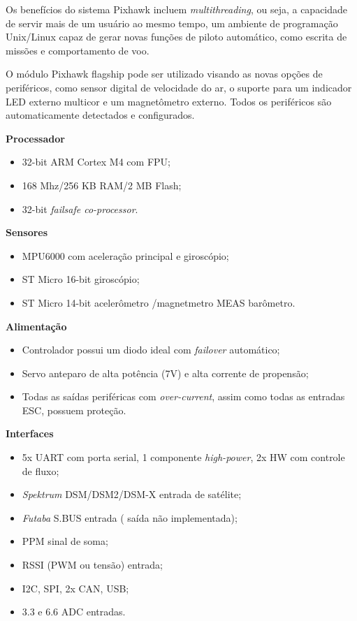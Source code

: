 Os benefícios do sistema Pixhawk incluem \textit{multithreading}, ou seja, a capacidade de servir mais de um usuário ao 
mesmo tempo, um ambiente de programação Unix/Linux capaz de gerar novas funções de piloto automático, como 
escrita de missões e comportamento de voo. \cite{pix}
 
O módulo Pixhawk flagship pode ser utilizado visando as novas opções de periféricos, como sensor digital de velocidade do ar, o suporte para um indicador LED externo multicor e um magnetômetro externo. Todos os periféricos são automaticamente detectados e configurados. \cite{pix}


\textbf{Processador}
\begin{itemize}
	\item 32-bit ARM Cortex M4 com FPU;
	\item 168 Mhz/256 KB RAM/2 MB Flash;
	\item 32-bit \textit{failsafe co-processor}.
\end{itemize}

\textbf{Sensores}
\begin{itemize}
\item MPU6000 com aceleração principal e giroscópio;
\item ST Micro 16-bit giroscópio;
\item ST Micro 14-bit acelerômetro /magnetmetro  MEAS barômetro.
\end{itemize}

\textbf{Alimentação}
\begin{itemize}
\item Controlador possui um diodo ideal com \textit{failover} automático;
\item Servo anteparo de alta potência (7V) e alta corrente de propensão;
\item Todas as saídas periféricas com \textit{over-current}, assim como todas as entradas ESC, possuem proteção.
\end{itemize}

\textbf{Interfaces}
\begin{itemize}
\item 5x UART com porta serial, 1 componente \textit{high-power}, 2x HW com controle de fluxo;
\item \textit{Spektrum} DSM/DSM2/DSM-X entrada de satélite;
\item \textit{Futaba} S.BUS entrada ( saída não implementada);
\item PPM sinal de soma;
\item RSSI (PWM ou tensão) entrada;
\item I2C, SPI, 2x CAN, USB;
\item 3.3 e 6.6 ADC entradas.
\end{itemize}

